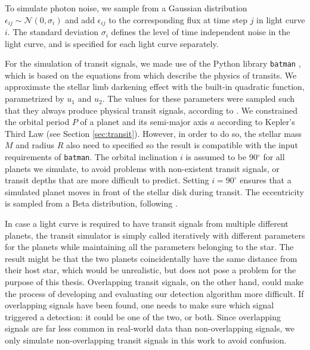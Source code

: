 To simulate photon noise, we sample from a Gaussian distribution $\epsilon_{ij} \sim \mathcal{N}(0, \sigma_i)$ and add $\epsilon_{ij}$ to the corresponding flux at time step $j$ in light curve $i$. The standard deviation $\sigma_i$ defines the level of time independent noise in the light curve, and is specified for each light curve separately.

For the simulation of transit signals, we made use of the Python library \texttt{batman} \citep{kreidberg2015batman}, which is based on the equations from \cite{mandel2002analytic} which describe the physics of transits. We approximate the stellar limb darkening effect with the built-in quadratic function, parametrized by $u_1$ and $u_2$. The values for these parameters were sampled such that they always produce physical transit signals, according to \cite{kipping2013efficient}. We constrained the orbital period $P$ of a planet and its semi-major axis $a$ according to Kepler's Third Law (see Section \ref{sec:transit}). However, in order to do so, the stellar mass $M$ and radius $R$ also need to specified so the result is compatible with the input requirements of \texttt{batman}. The orbital inclination $i$ is assumed to be 90$^\circ$ for all planets we simulate, to avoid problems with non-existent transit signals, or transit depths that are more difficult to predict. Setting $i=90^\circ$ ensures that a simulated planet moves in front of the stellar disk during transit. The eccentricity is sampled from a Beta distribution, following \cite{kipping2013parametrizing}.

In case a light curve is required to have transit signals from multiple different planets, the transit simulator is simply called iteratively with different parameters for the planets while maintaining all the parameters belonging to the star. The result might be that the two planets coincidentally have the same distance from their host star, which would be unrealistic, but does not pose a problem for the purpose of this thesis. Overlapping transit signals, on the other hand, could make the process of developing and evaluating our detection algorithm more difficult. If overlapping signals have been found, one needs to make sure which signal triggered a detection: it could be one of the two, or both. Since overlapping signals are far less common in real-world data than non-overlapping signals, we only simulate non-overlapping transit signals in this work to avoid confusion.

